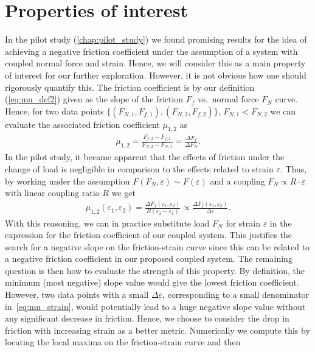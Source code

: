 \section{Properties of interest} 
In the pilot study (\cref{chap:pilot_study}) we found promising results for the idea of achieving a negative friction coefficient under the assumption of a system with coupled normal force and strain. Hence, we will consider this as a main property of interest for our further exploration. However, it is not obvious how one should rigorously quantify this. The friction coefficient is by our definition (\cref{eq:mu_def2}) given as the slope of the friction $F_f$ vs.\ normal force $F_N$ curve. Hence, for two data points $\{(F_{N,1}, F_{f,1}), (F_{N,2}, F_{f,2})\}$, $F_{N,1} < F_{N,2}$ we can evaluate the associated friction coefficient $\mu_{1,2}$ as 
\begin{align*}
  \mu_{1,2} = \frac{F_{f,2} - F_{f,1}}{F_{N,2} - F_{N,1}} = \frac{\Delta F_f}{\Delta F_N}.
\end{align*}
In the pilot study, it became apparent that the effects of friction under the
change of load is negligible in comparison to the effects related to strain $\varepsilon$.
Thus, by working under the assumption $F(F_N, \varepsilon) \sim F(\varepsilon)$ and a coupling $F_N
\propto R\cdot \varepsilon$ with linear coupling ratio $R$ we get 
\begin{align}
  \mu_{1,2}(\varepsilon_1, \varepsilon_2) = \frac{\Delta F_{f}(\varepsilon_1, \varepsilon_2)}{R(\varepsilon_2 - \varepsilon_1)} \propto \frac{\Delta F_{f}(\varepsilon_1, \varepsilon_2)}{\Delta \varepsilon}.
  \label{eq:mu_strain}
\end{align}
With this reasoning, we can in practice substitute load $F_N$ for strain
$\varepsilon$ in the expression for the friction coefficient of our coupled
system. This justifies the search for a negative slope on the friction-strain
curve since this can be related to a negative friction coefficient in our
proposed coupled system. The remaining question is then how to evaluate the
strength of this property. By definition, the minimum (most negative) slope
value would give the lowest friction coefficient. However, two data points with
a small $\Delta \varepsilon$, corresponding to a small denominator
in~\cref{eq:mu_strain}, would potentially lead to a huge negative slope value
without any significant decrease in friction. Hence, we choose to consider the
drop in friction with increasing strain as a better metric. Numerically we
compute this by locating the local maxima on the friction-strain curve and then
